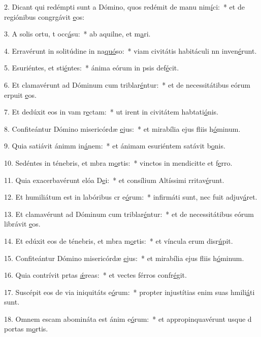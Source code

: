 2. Dicant qui redémpti sunt a Dómino, quos redémit de manu nim\uline{í}ci:~* et de regiónibus congrgávit \uline{e}os:\par 
3. A solis ortu, t occ\uline{á}su:~* ab aquilne, et m\uline{a}ri.\par 
4. Erravérunt in solitúdine in na\uline{quó}so:~* viam civitátis habitáculi nn inven\uline{é}runt.\par 
5. Esuriéntes, et sti\uline{é}ntes:~* ánima eórum in psis def\uline{é}cit.\par 
6. Et clamavérunt ad Dóminum cum triblar\uline{é}ntur:~* et de necessitátibus eórum erpuit \uline{e}os.\par 
7. Et dedúxit eos in vam r\uline{e}ctam:~* ut irent in civitátem habtati\uline{ó}nis.\par 
8. Confiteántur Dómino misericórdæ \uline{e}jus:~* et mirabília ejus fliis h\uline{ó}minum.\par 
9. Quia satiávit ánimm in\uline{á}nem:~* et ánimam esuriéntem satávit b\uline{o}nis.\par 
10. Sedéntes in ténebris, et mbra m\uline{o}rtis:~* vinctos in mendicitte et f\uline{e}rro.\par 
11. Quia exacerbavérunt elóa D\uline{e}i:~* et consílium Altíssimi rritav\uline{é}runt.\par 
12. Et humiliátum est in labóribus cr e\uline{ó}rum:~* infirmáti sunt, nec fuit  adjuv\uline{á}ret.\par 
13. Et clamavérunt ad Dóminum cum triblar\uline{é}ntur:~* et de necessitátibus eórum librávit \uline{e}os.\par 
14. Et edúxit eos de ténebris, et mbra m\uline{o}rtis:~* et víncula erum disr\uline{ú}pit.\par 
15. Confiteántur Dómino misericórdæ \uline{e}jus:~* et mirabília ejus fliis h\uline{ó}minum.\par 
16. Quia contrívit prtas \uline{ǽ}reas:~* et vectes férros confr\uline{é}git.\par 
17. Suscépit eos de via iniquitáts e\uline{ó}rum:~* propter injustítias enim suas hmili\uline{á}ti sunt.\par 
18. Omnem escam abomináta est ánim e\uline{ó}rum:~* et appropinquavérunt usque d portas m\uline{o}rtis.\par 
